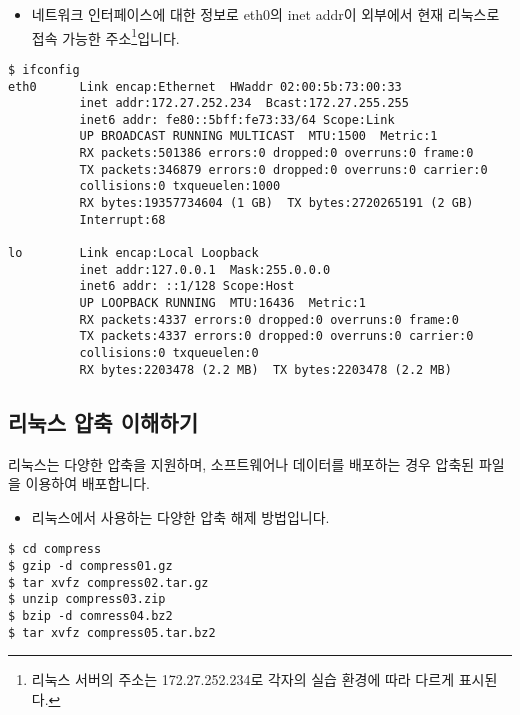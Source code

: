 \documentclass{article}
\begin{document}
\begin{itemize}
\item
  \begin{itemize}
  네트워크 인터페이스에 대한 정보로 eth0의 inet addr이 외부에서 현재 리눅스로 접속 가능한 주소\footnote{리눅스 서버의 주소는 172.27.252.234로 각자의 실습 환경에 따라 다르게 표시된다.}입니다.
  \end{itemize}
\end{itemize}
\begin{lstlisting}[frame=single,style=Bash,xleftmargin=1.4cm,xrightmargin=1.4cm]
$ ifconfig
eth0      Link encap:Ethernet  HWaddr 02:00:5b:73:00:33  
          inet addr:172.27.252.234  Bcast:172.27.255.255
          inet6 addr: fe80::5bff:fe73:33/64 Scope:Link
          UP BROADCAST RUNNING MULTICAST  MTU:1500  Metric:1
          RX packets:501386 errors:0 dropped:0 overruns:0 frame:0
          TX packets:346879 errors:0 dropped:0 overruns:0 carrier:0
          collisions:0 txqueuelen:1000 
          RX bytes:19357734604 (1 GB)  TX bytes:2720265191 (2 GB)
          Interrupt:68 

lo        Link encap:Local Loopback  
          inet addr:127.0.0.1  Mask:255.0.0.0
          inet6 addr: ::1/128 Scope:Host
          UP LOOPBACK RUNNING  MTU:16436  Metric:1
          RX packets:4337 errors:0 dropped:0 overruns:0 frame:0
          TX packets:4337 errors:0 dropped:0 overruns:0 carrier:0
          collisions:0 txqueuelen:0 
          RX bytes:2203478 (2.2 MB)  TX bytes:2203478 (2.2 MB)
\end{lstlisting}

\subsection{리눅스 압축 이해하기}
리눅스는 다양한 압축을 지원하며, 소프트웨어나 데이터를 배포하는 경우 압축된 파일을 이용하여 배포합니다.

\begin{itemize}
\item
  \begin{itemize}
  리눅스에서 사용하는 다양한 압축 해제 방법입니다.  
  \end{itemize}
\end{itemize}
\begin{lstlisting}[frame=single,style=Bash,xleftmargin=1.4cm,xrightmargin=1.4cm]
$ cd compress
$ gzip -d compress01.gz
$ tar xvfz compress02.tar.gz
$ unzip compress03.zip
$ bzip -d comress04.bz2
$ tar xvfz compress05.tar.bz2
\end{lstlisting}
\end{document}
